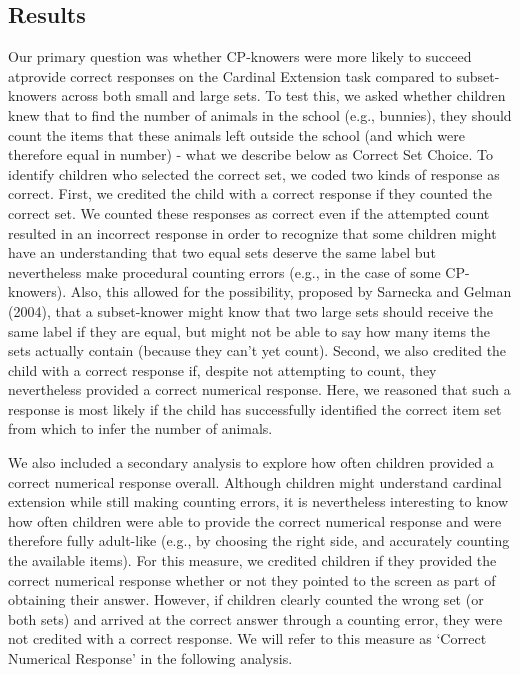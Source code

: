 \documentclass[
  man,floatsintext]{apa7}
\begin{document}
\subsection{Results}\label{results}

Our primary question was whether CP-knowers were more likely to succeed atprovide correct responses on the Cardinal Extension task compared to subset-knowers across both small and large sets. To test this, we asked whether children knew that to find the number of animals in the school (e.g., bunnies), they should count the items that these animals left outside the school (and which were therefore equal in number) - what we describe below as Correct Set Choice. To identify children who selected the correct set, we coded two kinds of response as correct. First, we credited the child with a correct response if they counted the correct set. We counted these responses as correct even if the attempted count resulted in an incorrect response in order to recognize that some children might have an understanding that two equal sets deserve the same label but nevertheless make procedural counting errors (e.g., in the case of some CP-knowers). Also, this allowed for the possibility, proposed by Sarnecka and Gelman (2004), that a subset-knower might know that two large sets should receive the same label if they are equal, but might not be able to say how many items the sets actually contain (because they can't yet count). Second, we also credited the child with a correct response if, despite not attempting to count, they nevertheless provided a correct numerical response. Here, we reasoned that such a response is most likely if the child has successfully identified the correct item set from which to infer the number of animals.

We also included a secondary analysis to explore how often children provided a correct numerical response overall. Although children might understand cardinal extension while still making counting errors, it is nevertheless interesting to know how often children were able to provide the correct numerical response and were therefore fully adult-like (e.g., by choosing the right side, and accurately counting the available items). For this measure, we credited children if they provided the correct numerical response whether or not they pointed to the screen as part of obtaining their answer. However, if children clearly counted the wrong set (or both sets) and arrived at the correct answer through a counting error, they were not credited with a correct response. We will refer to this measure as `Correct Numerical Response' in the following analysis.
\end{document}
